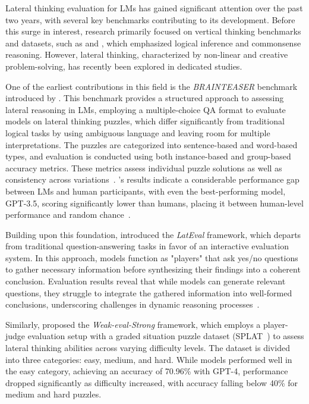 Lateral thinking evaluation for \acp{LM} has gained significant attention over the past two years, with several key benchmarks contributing to its development. Before this surge in interest, research primarily focused on vertical thinking benchmarks and datasets, such as  and , which emphasized logical inference and commonsense reasoning. However, lateral thinking, characterized by non-linear and creative problem-solving, has recently been explored in dedicated studies.

One of the earliest contributions in this field is the \textit{BRAINTEASER} benchmark introduced by \textcite{jiangBRAINTEASERLateralThinking2023}. This benchmark provides a structured approach to assessing lateral reasoning in \acp{LM}, employing a multiple-choice \ac{QA} format to evaluate models on lateral thinking puzzles, which differ significantly from traditional logical tasks by using ambiguous language and leaving room for multiple interpretations. The puzzles are categorized into sentence-based and word-based types, and evaluation is conducted using both instance-based and group-based accuracy metrics. These metrics assess individual puzzle solutions as well as consistency across variations~\cite{jiangBRAINTEASERLateralThinking2023}. \citeauthor{jiangBRAINTEASERLateralThinking2023}'s results indicate a considerable performance gap between \acp{LM} and human participants, with even the best-performing model, \ac{GPT}-3.5, scoring significantly lower than humans, placing it between human-level performance and random chance~\cite{jiangBRAINTEASERLateralThinking2023}.

Building upon this foundation, \textcite{huangLatEvalInteractiveLLMs2024} introduced the \textit{LatEval} framework, which departs from traditional question-answering tasks in favor of an interactive evaluation system. In this approach, models function as "players" that ask yes/no questions to gather necessary information before synthesizing their findings into a coherent conclusion. Evaluation results reveal that while models can generate relevant questions, they struggle to integrate the gathered information into well-formed conclusions, underscoring challenges in dynamic reasoning processes~\cite{huangLatEvalInteractiveLLMs2024}.

Similarly, \textcite{chenWeakevalStrongEvaluatingEliciting2024} proposed the \textit{Weak-eval-Strong} framework, which employs a player-judge evaluation setup with a graded situation puzzle dataset (SPLAT~\cite{chenWeakevalStrongEvaluatingEliciting2024}) to assess lateral thinking abilities across varying difficulty levels. The dataset is divided into three categories: easy, medium, and hard. While models performed well in the easy category, achieving an accuracy of 70.96\% with \ac{GPT}-4, performance dropped significantly as difficulty increased, with accuracy falling below 40\% for medium and hard puzzles.

